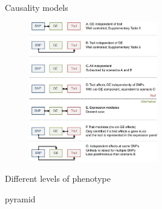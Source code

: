 \documentclass[aspectratio=169,12pt]{beamer}
\begin{document}
\begin{frame}{Causality models}

	\begin{figure}
		\includegraphics[width=0.5\textwidth]{gusev2016/2-causality_models}
	\end{figure}

\end{frame}

\begin{frame}{Different levels of phenotype}

	pyramid

\end{frame}
\end{document}
